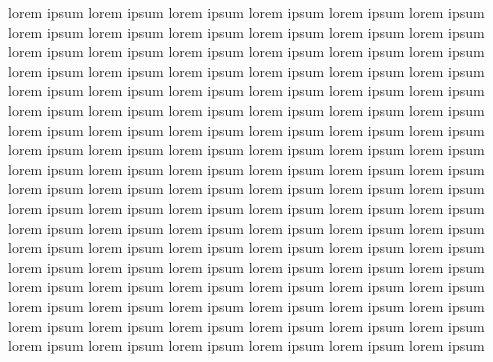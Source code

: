 lorem ipsum lorem ipsum lorem ipsum lorem ipsum lorem ipsum lorem ipsum lorem ipsum lorem ipsum lorem ipsum lorem ipsum lorem ipsum lorem ipsum lorem ipsum lorem ipsum lorem ipsum lorem ipsum lorem ipsum lorem ipsum lorem ipsum lorem ipsum lorem ipsum lorem ipsum lorem ipsum lorem ipsum lorem ipsum lorem ipsum lorem ipsum lorem ipsum lorem ipsum lorem ipsum lorem ipsum lorem ipsum lorem ipsum lorem ipsum lorem ipsum lorem ipsum lorem ipsum lorem ipsum lorem ipsum lorem ipsum lorem ipsum lorem ipsum lorem ipsum lorem ipsum lorem ipsum lorem ipsum lorem ipsum lorem ipsum lorem ipsum lorem ipsum lorem ipsum lorem ipsum lorem ipsum lorem ipsum lorem ipsum lorem ipsum lorem ipsum lorem ipsum lorem ipsum lorem ipsum lorem ipsum lorem ipsum lorem ipsum lorem ipsum lorem ipsum lorem ipsum lorem ipsum lorem ipsum lorem ipsum lorem ipsum lorem ipsum lorem ipsum lorem ipsum lorem ipsum lorem ipsum lorem ipsum lorem ipsum lorem ipsum lorem ipsum lorem ipsum lorem ipsum lorem ipsum lorem ipsum lorem ipsum lorem ipsum lorem ipsum lorem ipsum lorem ipsum lorem ipsum lorem ipsum lorem ipsum lorem ipsum lorem ipsum lorem ipsum lorem ipsum lorem ipsum lorem ipsum lorem ipsum lorem ipsum lorem ipsum lorem ipsum lorem ipsum lorem ipsum lorem ipsum lorem ipsum lorem ipsum lorem ipsum lorem ipsum 